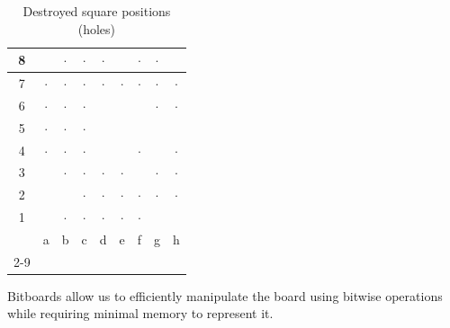 \documentclass[12pt,a4paper,twoside,openright]{book}
\begin{document}
\begin{itemize}
\begin{table}[htpb]
\centering
\caption{Destroyed square positions (holes)}
\label{tab:empty_positions_game_example_move21}
\begin{tabular}{|c|c|c|c|c|c|c|c|c|}
\hline
8 & \raisebox{-0.3ex}{$\blacksquare$} & $\cdot$ & $\cdot$ & $\cdot$ & \raisebox{-0.3ex}{$\blacksquare$} & $\cdot$ & $\cdot$ & \raisebox{-0.3ex}{$\blacksquare$} \\ \hline
7 & $\cdot$ & $\cdot$ & $\cdot$ & $\cdot$ & $\cdot$ & $\cdot$ & $\cdot$ & $\cdot$ \\ \hline
6 & $\cdot$ & $\cdot$ & $\cdot$ & \raisebox{-0.3ex}{$\blacksquare$} & \raisebox{-0.3ex}{$\blacksquare$} & \raisebox{-0.3ex}{$\blacksquare$} & $\cdot$ & $\cdot$ \\ \hline
5 & $\cdot$ & $\cdot$ & $\cdot$ & \raisebox{-0.3ex}{$\blacksquare$} & \raisebox{-0.3ex}{$\blacksquare$} & \raisebox{-0.3ex}{$\blacksquare$} & \raisebox{-0.3ex}{$\blacksquare$} & \raisebox{-0.3ex}{$\blacksquare$} \\ \hline
4 & $\cdot$ & $\cdot$ & $\cdot$ & \raisebox{-0.3ex}{$\blacksquare$} & \raisebox{-0.3ex}{$\blacksquare$} & $\cdot$ & \raisebox{-0.3ex}{$\blacksquare$} & $\cdot$ \\ \hline
3 & \raisebox{-0.3ex}{$\blacksquare$} & $\cdot$ & $\cdot$ & $\cdot$ & $\cdot$ & \raisebox{-0.3ex}{$\blacksquare$} & $\cdot$ & $\cdot$ \\ \hline
2 & \raisebox{-0.3ex}{$\blacksquare$} & \raisebox{-0.3ex}{$\blacksquare$} & $\cdot$ & $\cdot$ & $\cdot$ & $\cdot$ & $\cdot$ & $\cdot$ \\ \hline
1 & \raisebox{-0.3ex}{$\blacksquare$} & $\cdot$ & $\cdot$ & $\cdot$ & $\cdot$ & $\cdot$ & \raisebox{-0.3ex}{$\blacksquare$} & \raisebox{-0.3ex}{$\blacksquare$} \\ \hline
\multicolumn{1}{c|}{} & a & b & c & d & e & f & g & h \\
\cline{2-9}
\end{tabular}
\end{table}

\end{itemize}


Bitboards allow us to efficiently manipulate the board using bitwise operations while requiring minimal memory to represent it.\\
\end{document}
